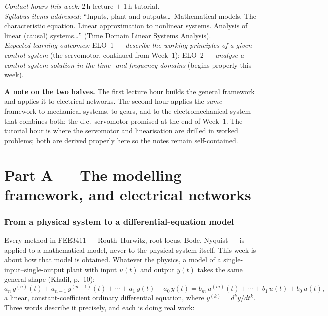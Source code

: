 \documentclass[11pt,a4paper]{article}
\begin{document}
\noindent
\emph{Contact hours this week:} 2\,h lecture $+$ 1\,h tutorial.\\
\emph{Syllabus items addressed:} ``Inputs, plant and outputs\ldots\ Mathematical
models. The characteristic equation. Linear approximation to nonlinear systems.
Analysis of linear (causal) systems\ldots'' (Time Domain Linear Systems
Analysis).\\
\emph{Expected learning outcomes:} ELO~1 --- \emph{describe the working
principles of a given control system} (the servomotor, continued from
Week~1); ELO~2 --- \emph{analyse a control system solution in the time- and
frequency-domains} (begins properly this week).

\bigskip
\noindent
\textbf{A note on the two halves.} The first lecture hour builds the general
framework and applies it to electrical networks. The second hour applies the
\emph{same} framework to mechanical systems, to gears, and to the
electromechanical system that combines both: the d.c.\ servomotor promised at
the end of Week~1. The tutorial hour is where the servomotor and linearisation
are drilled in worked problems; both are derived properly here so the notes
remain self-contained.

\part*{Part A --- The modelling framework, and electrical networks}

\section{From a physical system to a differential-equation model}
\label{sec:framework}

Every method in FEE3411 --- Routh--Hurwitz, root locus, Bode, Nyquist --- is
applied to a mathematical model, never to the physical system itself. This
week is about how that model is obtained. Whatever the physics, a model of a
single-input--single-output plant with input $u(t)$ and output $y(t)$ takes the
same general shape (Khalil, p.~10):
\begin{equation}
  a_n\,y^{(n)}(t) + a_{n-1}\,y^{(n-1)}(t) + \cdots + a_1\,\dot y(t) + a_0\,y(t)
  = b_m\,u^{(m)}(t) + \cdots + b_1\,\dot u(t) + b_0\,u(t),
  \label{eq:general-ode}
\end{equation}
a linear, constant-coefficient ordinary differential equation, where
$y^{(k)}=d^k y/dt^k$. Three words describe it precisely, and each is doing real
work:
\end{document}

